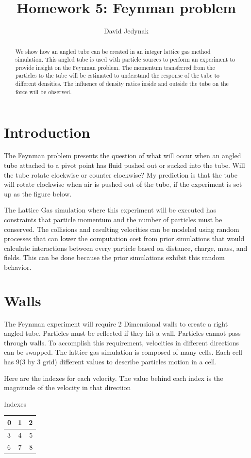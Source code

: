 \documentclass{article}
\begin{document}
\lstset{language=C} 
\title{Homework 5: Feynman problem}
\author{David Jedynak}
\maketitle
\begin{abstract}
 We show how an angled tube can be created in an integer lattice gas method simulation. This angled tube is used with particle sources to perform an experiment to provide insight on the Feynman problem. The momentum transferred from the particles to the tube will be estimated to understand the response of the tube to different densities. The influence of density ratios inside and outside the tube on the force will be observed.
\end{abstract}

\section{Introduction}
The Feynman problem presents the question of what will occur when an angled tube attached to a pivot point has fluid pushed out or sucked into the tube. Will the tube rotate clockwise or counter clockwise? My prediction is that the tube will rotate clockwise when air is pushed out of the tube, if the experiment is set up as the figure below.



The Lattice Gas simulation where this experiment will be executed has constraints that particle momentum and the number of particles must be conserved. The collisions and resulting velocities can be modeled using random processes that can lower the computation cost from prior simulations that would calculate interactions between every particle based on distance, charge, mass, and fields. This can be done because the prior simulations exhibit this random behavior.


\section{Walls}
The Feynman experiment will require 2 Dimensional walls to create a right angled tube. Particles must be reflected if they hit a wall. Particles cannot pass through walls. To accomplish this requirement, velocities in different directions can be swapped. The lattice gas simulation is composed of many cells. Each cell has 9(3 by 3 grid) different values to describe particles motion in a cell.


Here are the indexes for each velocity. The value behind each index is the magnitude of the velocity in that direction
\begin{center}
Indexes ~
\begin{tabular}{l c r}
	\hline
	0 & 1 & 2 \\ \hline
	3 & 4 & 5 \\ \hline
	6 & 7 & 8 \\ 
	\hline
\end{tabular}
\end{center}
\end{document}
